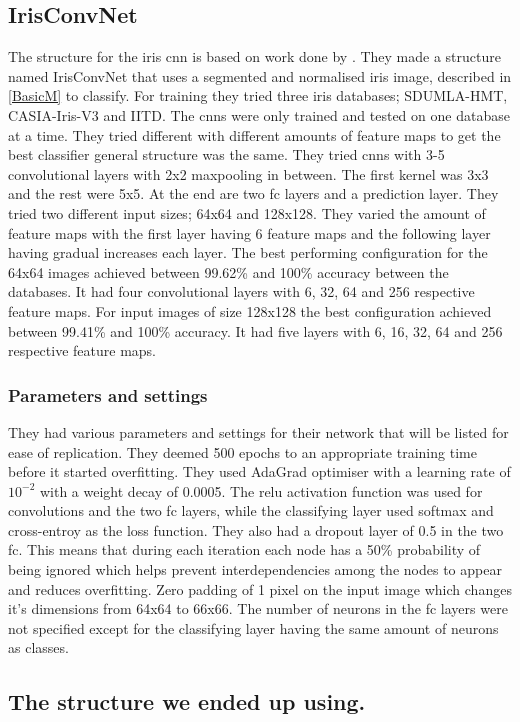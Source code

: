 \subsection{IrisConvNet}
The structure for the iris \gls{cnn} is based on work done by \cite{Al-Waisy2017}. They made a structure named IrisConvNet that uses a segmented and normalised iris image, described in \autoref{BasicM} to classify. For training they tried three iris databases; SDUMLA-HMT, CASIA-Iris-V3 and IITD. The \gls{cnn}s were only trained and tested on one database at a time.  They tried different with different amounts of feature maps to get the best classifier general structure was the same. They tried \gls{cnn}s with 3-5 convolutional layers with 2x2 maxpooling in between. The first kernel was 3x3 and the rest were 5x5. At the end are two \gls{fc} layers and a prediction layer. They tried two different input sizes; 64x64 and 128x128. They varied the amount of feature maps with the first layer having 6 feature maps and the following layer having gradual increases each layer. The best performing configuration for the 64x64 images achieved between 99.62\% and 100\% accuracy between the databases. It had four convolutional layers with 6, 32, 64 and 256 respective feature maps. For input images of size 128x128 the best configuration achieved between 99.41\% and 100\% accuracy. It had five layers with 6, 16, 32, 64 and 256 respective feature maps.

\subsubsection{Parameters and settings}
They had various parameters and settings for their network that will be listed for ease of replication. They deemed 500 epochs to an appropriate training time before it started overfitting. They used AdaGrad optimiser with a learning rate of $10^{-2}$ with a weight decay of 0.0005. The \gls{relu} activation function was used for convolutions and the two \gls{fc} layers, while the classifying layer used softmax and cross-entroy as the loss function. They also had a dropout layer of 0.5 in the two \gls{fc}. This means that during each iteration each node has a 50\% probability of being ignored which helps prevent interdependencies among the nodes to appear and reduces overfitting. Zero padding of 1 pixel on the input image which changes it's dimensions from 64x64 to 66x66. The number of neurons in the \gls{fc} layers were not specified except for the classifying layer having the same amount of neurons as classes. 

\subsection{The structure we ended up using.}
